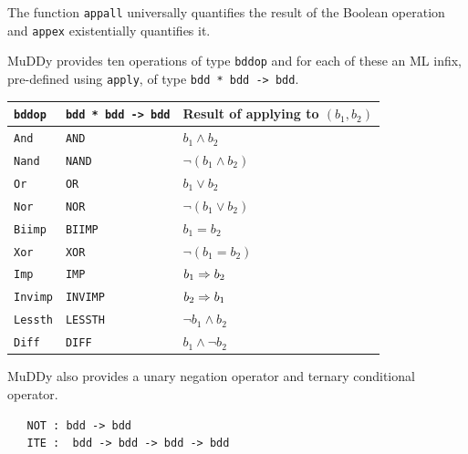 \documentclass[12pt,fleqn]{book}
\renewcommand{\t}[1]{\mbox{\tt #1}}
\newcommand{\Muddy}{MuDDy{}}
\begin{document}
The function \t{appall} universally quantifies the result of the
Boolean operation and \t{appex} existentially quantifies it.

\Muddy{} provides ten operations of type \t{bddop} and for each of
these an ML infix, pre-defined using \t{apply}, of type \t{bdd~*~bdd~->~bdd}.



\begin{center}

\begin{tabular}{|l||l|l|} \hline
\t{bddop}\index{HolBddLib!ML bindings!{bddop}@\ml{bddop}} & \t{bdd~*~bdd~->~bdd} & Result of applying to $(b_1,b_2)$\\ \hline\hline
\t{And}\index{HolBddLib!ML bindings!{And}@\ml{And}} & \t{AND} & $b_1\wedge b_2$ \\ \hline
\t{Nand}\index{HolBddLib!ML bindings!{Nand}@\ml{Nand}} & \t{NAND} & $\neg(b_1\wedge b_2)$ \\ \hline
\t{Or}\index{HolBddLib!ML bindings!{Or}@\ml{Or}}  & \t{OR} & $b_1\vee b_2$ \\ \hline
\t{Nor}\index{HolBddLib!ML bindings!{Nor}@\ml{Nor}} & \t{NOR} & $\neg(b_1\vee b_2)$ \\ \hline
\t{Biimp}\index{HolBddLib!ML bindings!{Biimp}@\ml{Biimp}} & \t{BIIMP} & $b_1= b_2$ \\ \hline
\t{Xor}\index{HolBddLib!ML bindings!{Xor}@\ml{Xor}} & \t{XOR} & $\neg(b_1=b_2)$ \\ \hline
\t{Imp}\index{HolBddLib!ML bindings!{Imp}@\ml{Imp}} & \t{IMP} & $b_1\Rightarrow b_2$ \\ \hline
\t{Invimp}\index{HolBddLib!ML bindings!{Invimp}@\ml{Invimp}} & \t{INVIMP} & $b_2\Rightarrow b_1$ \\ \hline
\t{Lessth}\index{HolBddLib!ML bindings!{Lessth}@\ml{Lessth}} & \t{LESSTH} & $\neg b_1\wedge b_2$ \\ \hline
\t{Diff}\index{HolBddLib!ML bindings!{Diff}@\ml{Diff}} & \t{DIFF} & $b_1\wedge \neg b_2$ \\ \hline
\end{tabular}\label{bddops}

\end{center}

\Muddy{} also provides a unary negation operator and ternary conditional operator.

\begin{verbatim}
   NOT : bdd -> bdd
   ITE :  bdd -> bdd -> bdd -> bdd
\end{verbatim}
\end{document}
